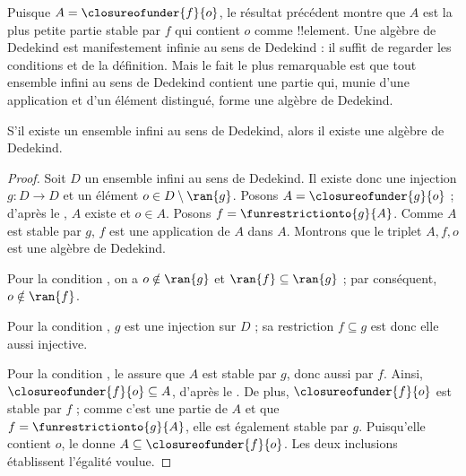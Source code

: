 \documentclass[../../../include/open-logic-section]{subfiles}
\begin{document}
Puisque $A = \closureofunder{f}{o}$, le résultat précédent montre que
$A$ est la plus petite partie stable par $f$ qui contient $o$ comme
!!{element}. Une algèbre de Dedekind est manifestement infinie au sens
de Dedekind : il suffit de regarder les conditions 
et  de la définition. Mais le fait le plus
remarquable est que tout ensemble infini au sens de Dedekind contient
une partie qui, munie d'une application et d'un élément distingué,
forme une algèbre de Dedekind.
%
%
%

\begin{thm}
S'il existe un ensemble infini au sens de Dedekind, alors il existe une
algèbre de Dedekind.
\end{thm}

\begin{proof}
Soit $D$ un ensemble infini au sens de Dedekind. Il existe donc une
injection $g\colon D\to D$ et un élément $o\in D\setminus\ran{g}$.
Posons $A = \closureofunder{g}{o}$ ; d'après le
, $A$ existe et $o \in A$.
Posons $f = \funrestrictionto{g}{A}$. Comme $A$ est stable par $g$,
$f$ est une application de $A$ dans $A$. Montrons que le triplet
$A,f,o$ est une algèbre de Dedekind.

Pour la condition , on a $o \notin \ran{g}$ et
$\ran{f} \subseteq \ran{g}$ ; par conséquent, $o\notin\ran{f}$.

Pour la condition , $g$ est une injection sur $D$ ;
sa restriction $f \subseteq g$ est donc elle aussi injective.

Pour la condition , le
 assure que $A$ est stable par $g$, donc
aussi par $f$. Ainsi, $\closureofunder{f}{o}\subseteq A$, d'après le
. De plus, $\closureofunder{f}{o}$ est stable
par $f$ ; comme c'est une partie de $A$ et que
$f = \funrestrictionto{g}{A}$, elle est également stable par $g$.
Puisqu'elle contient $o$, le  donne
$A\subseteq\closureofunder{f}{o}$. Les deux inclusions établissent
l'égalité voulue.
\end{proof}
\end{document}
